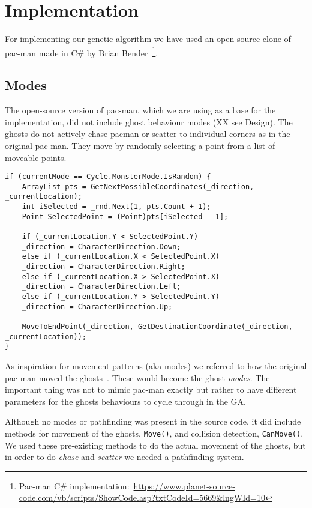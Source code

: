 
\section{Implementation} \label{sec:implementation}
For implementing our genetic algorithm we have used an open-source clone of pac-man made in C\# by Brian Bender~\footnote{Pac-man C\# implementation:~\url{https://www.planet-source-code.com/vb/scripts/ShowCode.asp?txtCodeId=5669&lngWId=10}}.

\subsection{Modes}
The open-source version of pac-man, which we are using as a base for the implementation, did not include ghost behaviour modes (XX see Design).
The ghosts do not actively chase pacman or scatter to individual corners as in the original pac-man.
They move by randomly selecting a point from a list of moveable points.

\begin{lstlisting}[caption=XXimage, label=lst:imp1]
if (currentMode == Cycle.MonsterMode.IsRandom) {
	ArrayList pts = GetNextPossibleCoordinates(_direction, _currentLocation);
	int iSelected = _rnd.Next(1, pts.Count + 1);
	Point SelectedPoint = (Point)pts[iSelected - 1];

	if (_currentLocation.Y < SelectedPoint.Y)
	_direction = CharacterDirection.Down;
	else if (_currentLocation.X < SelectedPoint.X)
	_direction = CharacterDirection.Right;
	else if (_currentLocation.X > SelectedPoint.X)
	_direction = CharacterDirection.Left;
	else if (_currentLocation.Y > SelectedPoint.Y)
	_direction = CharacterDirection.Up;

	MoveToEndPoint(_direction, GetDestinationCoordinate(_direction, _currentLocation));
}
\end{lstlisting}

As inspiration for movement patterns (aka modes) we referred to how the original pac-man moved the ghosts~\autocite{Mateas2003}.
These would become the ghost \emph{modes}.
The important thing was not to mimic pac-man exactly but rather to have different parameters for the ghosts behaviours to cycle through in the GA.

Although no modes or pathfinding was present in the source code, it did include methods for movement of the ghosts, \texttt{Move()}, and collision detection, \texttt{CanMove()}.
We used these pre-existing methods to do the actual movement of the ghosts, but in order to do \emph{chase} and \emph{scatter} we needed a pathfinding system.


